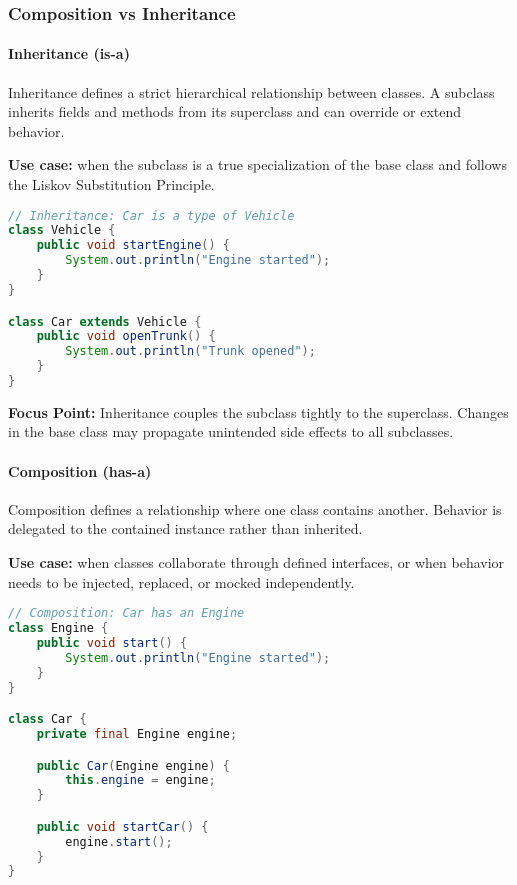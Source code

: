 \documentclass[a4paper,12pt]{article}
\begin{document}
\subsubsection{Composition vs Inheritance}

\paragraph{Inheritance (is-a)}
Inheritance defines a strict hierarchical relationship between classes. A subclass inherits fields and methods from its superclass and can override or extend behavior.

\textbf{Use case:} when the subclass is a true specialization of the base class and follows the Liskov Substitution Principle.

\begin{lstlisting}[language=Java]
// Inheritance: Car is a type of Vehicle
class Vehicle {
    public void startEngine() {
        System.out.println("Engine started");
    }
}

class Car extends Vehicle {
    public void openTrunk() {
        System.out.println("Trunk opened");
    }
}
\end{lstlisting}

\textbf{Focus Point:} Inheritance couples the subclass tightly to the superclass. Changes in the base class may propagate unintended side effects to all subclasses.

\paragraph{Composition (has-a)}
Composition defines a relationship where one class contains another. Behavior is delegated to the contained instance rather than inherited.

\textbf{Use case:} when classes collaborate through defined interfaces, or when behavior needs to be injected, replaced, or mocked independently.

\begin{lstlisting}[language=Java]
// Composition: Car has an Engine
class Engine {
    public void start() {
        System.out.println("Engine started");
    }
}

class Car {
    private final Engine engine;

    public Car(Engine engine) {
        this.engine = engine;
    }

    public void startCar() {
        engine.start();
    }
}
\end{lstlisting}
\end{document}

